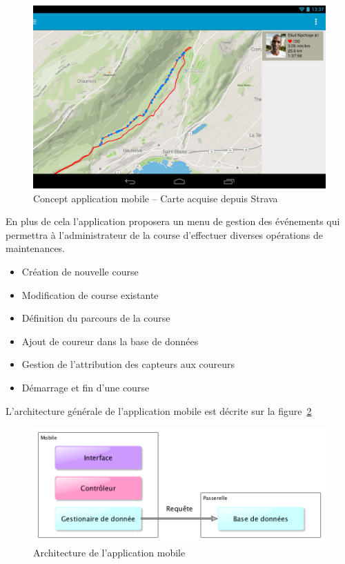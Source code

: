 \begin{figure}[htb]
\centering 
\includegraphics[width=0.8\columnwidth]{../images/app_mock.png} 
\caption[Concept application mobile]{Concept application mobile – Carte acquise depuis Strava}
\label{fig:esquisse_app}
\end{figure}

En plus de cela l’application proposera un menu de gestion des événements qui permettra à l’administrateur de la course d’effectuer diverses opérations de maintenances.

\begin{itemize}
\item Création de nouvelle course
\item Modification de course existante
\item Définition du parcours de la course
\item Ajout de coureur dans la base de données
\item Gestion de l’attribution des capteurs aux coureurs
\item Démarrage et fin d’une course
\end{itemize}

L'architecture générale de l'application mobile est décrite sur la figure~\ref{fig:archi_app}

\begin{figure}[H]
\centering 
\includegraphics[width=0.8\columnwidth]{../images/archi_app.png} 
\caption[Architecture de l’application mobile]{Architecture de l’application mobile}
\label{fig:archi_app}
\end{figure}

